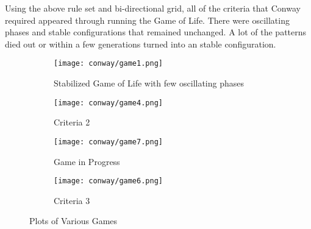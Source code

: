 Using the above rule set and bi-directional grid, all of the criteria that Conway required appeared through running the Game of Life. There were oscillating phases and stable configurations that remained unchanged. A lot of the patterns died out or within a few generations turned into an stable configuration.

\begin{figure}[tbh]
\begin{center}
    \begin{subfigure}[tbh]{0.475\textwidth}
    \begin{center}
    \texttt{[image: conway/game1.png]}
    \caption{ Stabilized Game of Life with few oscillating phases }
    \end{center}
    \end{subfigure}
\hfill
    \begin{subfigure}[tbh]{0.475\textwidth}
    \begin{center}
    \texttt{[image: conway/game4.png]}
    \caption{ Criteria 2 }
    \end{center}
    \end{subfigure}
\hfill
    \begin{subfigure}[tbh]{0.475\textwidth}
    \begin{center}
    \texttt{[image: conway/game7.png]}
    \caption{ Game in Progress }
    \end{center}
    \end{subfigure}
\hfill
    \begin{subfigure}[tbh]{0.475\textwidth}
    \begin{center}
    \texttt{[image: conway/game6.png]}
    \caption{ Criteria 3 }
    \end{center}
    \end{subfigure}
\hfill
\end{center}
\caption{Plots of Various Games \label{conway} }
\end{figure}
